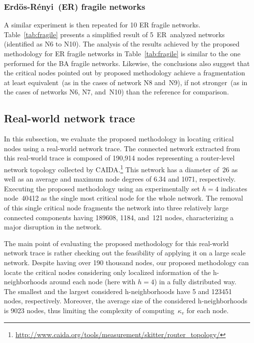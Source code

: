 \documentclass[conference,fleqn]{IEEEtran}
\begin{document}
\subsubsection{Erd\"{o}s-R\'{e}nyi~(ER) fragile networks}

A similar experiment is then repeated for 10 ER fragile networks. Table~\ref{tab:fragile} presents a simplified 
result of 5~ER~analyzed networks (identified as N6 to N10). 
The analysis of the results achieved by the proposed methodology for ER fragile networks
in Table~\ref{tab:fragile} is similar to the one performed for the BA fragile networks. Likewise, the conclusions
also suggest that the critical nodes pointed out by proposed methodology achieve a fragmentation at least
equivalent~(as in the cases of network N8 and~N9), if not stronger~(as in the cases of networks N6, N7, and~N10) than the
reference for comparison.



\subsection{Real-world network trace}

In this subsection, we evaluate the proposed methodology in locating critical nodes using a real-world network trace.
The connected network extracted from this real-world trace is composed of 190,914 nodes representing a router-level
network topology collected by CAIDA.\footnote{\url{http://www.caida.org/tools/measurement/skitter/router_topology/}}
This network has a diameter of~26 as well as an average and maximum node degrees of 6.34 and 1071, respectively.
Executing the proposed methodology using an experimentally set $h=4$ indicates node~40412 as the single most critical node 
for the whole network. The 
removal of this single critical node fragments the network into three relatively large connected components having
189608, 1184, and~121 nodes, characterizing a major disruption in the network.

The main point of evaluating the proposed methodology for this real-world network trace is rather checking out
the feasibility of applying it on a large scale network. Despite having over 190 thousand nodes, our proposed
methodology can locate the critical nodes considering only localized information of the h-neighborhoods
around each node (here with $h=4$) in a fully distributed way. 
The smallest and the largest considered h-neighborhoods have 5 and 123451 nodes, respectively. 
Moreover, the average size of the considered h-neighborhoods
is 9023 nodes, thus limiting the complexity of computing~$\kappa_v$ for each node. 
\end{document}
